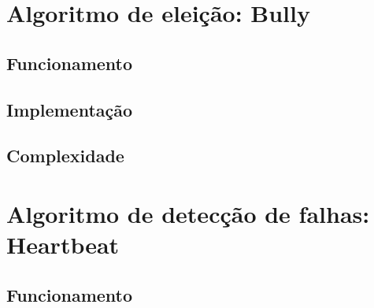 \section{Algoritmo de eleição: Bully}

\subsection{Funcionamento}

\subsection{Implementação}

\subsection{Complexidade}

\section{Algoritmo de detecção de falhas: Heartbeat}

\subsection{Funcionamento}


